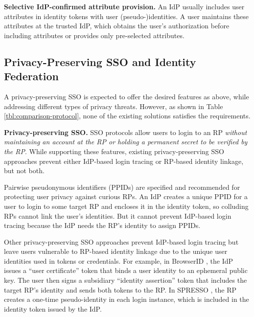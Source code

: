 
\noindent\textbf{Selective IdP-confirmed attribute provision.}
An IdP usually includes user attributes in identity tokens \cite{OpenIDConnect,rfc6749} with user (pseudo-)identities.
A user maintains these attributes at the trusted IdP,
which obtains the user's authorization before including attributes or provides only pre-selected attributes.

\subsection{Privacy-Preserving SSO and Identity Federation}
\label{subsec-solutions}

A privacy-preserving SSO is expected to offer the desired features as above,
    while addressing different types of privacy threats. However, as shown in
Table \ref{tbl:comparison-protocol}, none of the existing solutions satisfies the requirements.

\noindent\textbf{Privacy-preserving SSO.} SSO protocols \cite{OpenIDConnect,rfc6749, SAML, SAMLIdentifier} allow users to login to an RP \emph{without maintaining an account at the RP or holding a permanent secret to be verified by the RP}. While supporting these features, existing privacy-preserving SSO approaches \cite{BrowserID, SPRESSO, NIST2017draft} prevent either IdP-based login tracing or RP-based identity linkage, but not both. %

Pairwise pseudonymous identifiers (PPIDs) are specified \cite{OpenIDConnect, SAMLIdentifier} and recommended \cite{NIST2017draft}
for protecting user privacy against curious RPs.
An IdP creates a unique PPID for a user to login to some target RP and encloses it in the identity token,
 so colluding RPs cannot link the user's identities. But it cannot prevent IdP-based login tracing because the IdP needs the RP's identity to assign PPIDs.

Other privacy-preserving SSO approaches prevent IdP-based login tracing but leave users vulnerable to RP-based identity linkage due to the unique user identities used in tokens or credentials.
For example, in BrowserID \cite{BrowserID}, %
the IdP %
issues a ``user certificate'' token that binds a user identity to an ephemeral public key. The user then signs a subsidiary ``identity assertion'' token that includes the target RP's identity and sends both tokens to the RP.
In SPRESSO \cite{SPRESSO}, the RP creates a one-time pseudo-identity in each login instance, which is included in the identity token issued by the IdP. %

